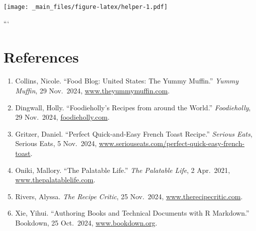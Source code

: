 \documentclass[
]{book}
\begin{document}
\texttt{[image: \_main\_files/figure-latex/helper-1.pdf]}

```

\chapter*{References}\label{references}

\begin{enumerate}
\def\labelenumi{\arabic{enumi}.}
\item
  Collins, Nicole. ``Food Blog: United States: The Yummy Muffin.''
  \emph{Yummy Muffin}, 29 Nov.~2024,
  \href{https://www.theyummymuffin.com/}{www.theyummymuffin.com}.
\item
  Dingwall, Holly. ``Foodieholly's Recipes from around the World.''
  \emph{Foodieholly}, 29 Nov.~2024,
  \href{https://foodieholly.com/}{foodieholly.com}.
\item
  Gritzer, Daniel. ``Perfect Quick-and-Easy French Toast Recipe.''
  \emph{Serious Eats}, Serious Eats, 5 Nov.~2024,
  \href{https://www.seriouseats.com/perfect-quick-easy-french-toast}{www.seriouseats.com/perfect-quick-easy-french-toast}.
\item
  Oniki, Mallory. ``The Palatable Life.'' \emph{The Palatable Life}, 2
  Apr.~2021,
  \href{https://www.thepalatablelife.com/}{www.thepalatablelife.com}.
\item
  Rivers, Alyssa. \emph{The Recipe Critic}, 25 Nov.~2024,
  \href{https://www.therecipecritic.com/}{www.therecipecritic.com}.
\item
  Xie, Yihui. ``Authoring Books and Technical Documents with R
  Markdown.'' Bookdown, 25 Oct.~2024,
  \href{https://bookdown.org/yihui/bookdown/}{www.bookdown.org}.
\end{enumerate}

\backmatter
\end{document}
